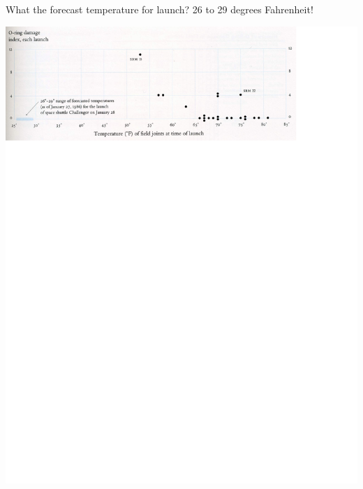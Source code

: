 \documentclass[pdflatex,landscape,titlepage]{foils}
\begin{document}

What the forecast temperature for launch?  26 to 29 degrees Fahrenheit!

\color{black}
\begin{center}
\includegraphics[width=10.5 in]{tufte_challenger_2}
\end{center}
\color{white}
\end{document}
